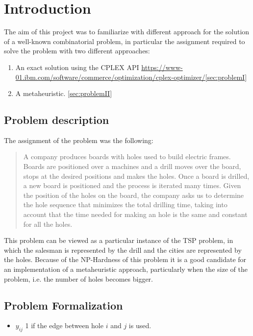 \section{Introduction}
The aim of this project was to familiarize with different approach for the solution of a well-known combinatorial problem, in
particular the assignment required to solve the problem with two different approaches:
\begin{enumerate}
	\item An exact solution using the CPLEX API \url{https://www-01.ibm.com/software/commerce/optimization/cplex-optimizer/}\ref{sec:problemI}
	
	\item A metaheuristic. \ref{sec:problemII}
\end{enumerate}
\subsection{Problem description}
The assignment of the problem was the following:
\begin{quote}
	A company produces boards with holes used to build electric frames. Boards are positioned over a 
	machines and a drill moves over the board, stops at the desired positions
	and makes the holes. Once a board is drilled, a new board is positioned and the process is
	iterated many times. Given the position of the holes on the board, the company asks us
	to determine the hole sequence that minimizes the total drilling time, taking into account
	that the time needed for making an hole is the same and constant for all the holes.
\end{quote}
This problem can be viewed as a particular instance of the TSP problem, in which the salesman is represented by the 
drill and the cities are represented by the holes.
Because of the NP-Hardness of this problem it is a good candidate for an implementation of a metaheuristic approach,
particularly when the size of the problem, i.e. the number of holes becomes bigger.
\subsection{Problem Formalization}
\begin{itemize}
	\item $y_{ij}$ 1 if the edge between hole $i$ and $j$ is used.
\end{itemize}
